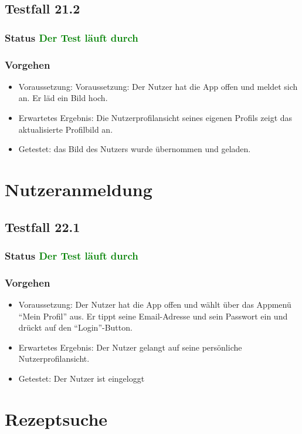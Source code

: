 \subsection{Testfall 21.2}
\subsubsection{Status \textcolor{green}{ Der Test läuft durch} }
\subsubsection{Vorgehen}
\begin{itemize}
\item Voraussetzung: Voraussetzung: Der Nutzer hat die App offen und meldet sich an. Er läd ein Bild hoch.
\item Erwartetes Ergebnis: Die Nutzerprofilansicht seines eigenen Profils zeigt das aktualisierte Profilbild an.
\item Getestet: das Bild des Nutzers wurde übernommen und geladen.
\end{itemize}


\section{Nutzeranmeldung}

\subsection{Testfall 22.1}
\subsubsection{Status \textcolor{green}{ Der Test läuft durch} }
\subsubsection{Vorgehen}
\begin{itemize}
\item Voraussetzung: Der Nutzer hat die App offen und wählt über das Appmenü "`Mein Profil"' aus. Er tippt seine Email-Adresse und sein Passwort ein und drückt auf den "`Login"'-Button.
\item Erwartetes Ergebnis: Der Nutzer gelangt auf seine persönliche Nutzerprofilansicht.
\item Getestet: Der Nutzer ist eingeloggt 
\end{itemize}

\section{Rezeptsuche}

